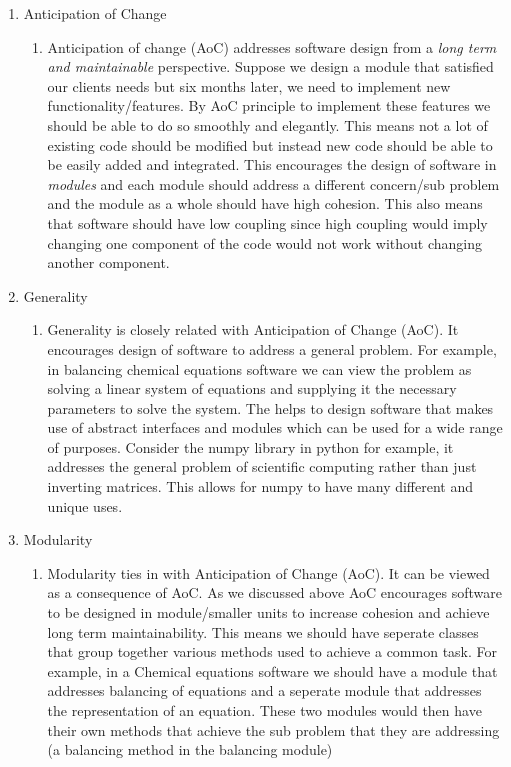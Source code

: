 \documentclass[12pt]{article}
\begin{document}
\begin{enumerate}[a)]
\begin{enumerate}
		\item Anticipation of Change
			\begin{enumerate}
					\item Anticipation of change (AoC) addresses software design from a \emph{long term and maintainable} perspective. Suppose we design a module that satisfied our clients needs but six months later, we need to implement new functionality/features. By AoC principle to implement these features we should be able to do so smoothly and elegantly. This means not a lot of existing code should be modified but instead new code should be able to be easily added and integrated. This encourages the design of software in \emph{modules} and each module should address a different concern/sub problem and the module as a whole should have high cohesion. This also means that software should have low coupling since high coupling would imply changing one component of the code would not work without changing another component.
			\end{enumerate}
		
		\item Generality
			\begin{enumerate}
			
			\item Generality is closely related with Anticipation of Change (AoC). It encourages design of software to address a general problem. For example, in balancing chemical equations software we can view the problem as solving a linear system of equations and supplying it the necessary parameters to solve the system. The helps to design software that makes use of abstract interfaces and modules which can be used for a wide range of purposes. Consider the numpy library in python for example, it addresses the general problem of scientific computing rather than just inverting matrices. This allows for numpy to have many different and unique uses.
					
			\end{enumerate}
			
		\item Modularity
			\begin{enumerate}
					\item Modularity ties in with Anticipation of Change (AoC). It can be viewed as a consequence of AoC. As we discussed above AoC encourages software to be designed in module/smaller units to increase cohesion and achieve long term maintainability. This means we should have seperate classes that group together various methods used to achieve a common task. For example, in a Chemical equations software we should have a module that addresses balancing of equations and a seperate module that addresses the representation of an equation. These two modules would then have their own methods that achieve the sub problem that they are addressing (a balancing method in the balancing module)
			\end{enumerate}
			

\end{enumerate}
\end{enumerate}
\end{document}
